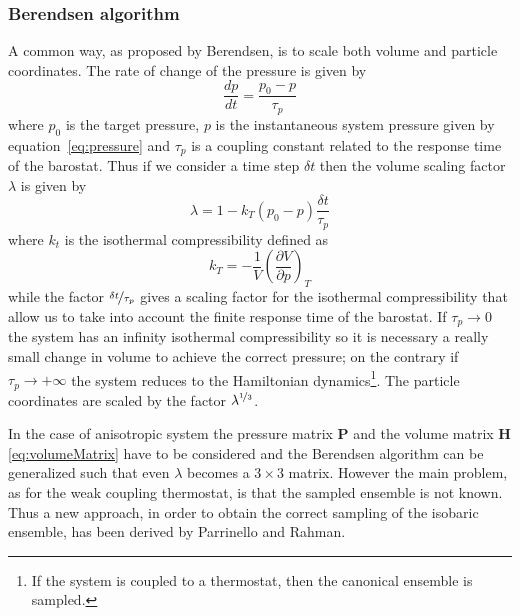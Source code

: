 \subsubsection{Berendsen algorithm}
A common way, as proposed by Berendsen, is to scale both volume and particle coordinates. The rate of change of
the pressure is given by
\begin{equation*}
	\frac{dp}{dt} = \frac{p_0 - p}{\tau_p}
\end{equation*}
where $p_0$ is the target pressure, $p$ is the instantaneous system pressure given by
equation~\eqref{eq:pressure} and $\tau_p$ is a coupling constant related to the response time of the barostat.
Thus if we consider a time step $\delta t$ then the volume scaling factor $\lambda$ is given by
\begin{equation*}
	\lambda = 1- k_T (p_0 - p) \frac{\delta t}{\tau_p}
\end{equation*}
where $k_t$ is the isothermal compressibility defined as
\begin{equation*}
	k_T = -\frac{1}{V}\left ( \frac{\partial V}{\partial p}\right )_{T}
\end{equation*}
while the factor $\nicefrac{\delta t}{\tau_p}$ gives a scaling factor for the isothermal compressibility that
allow us to take into account the finite response time of the barostat. If $\tau_p \rightarrow 0$ the system has
an infinity isothermal compressibility so it is necessary a really small change in volume to achieve the correct
pressure; on the contrary if $\tau_p \rightarrow +\infty$ the system reduces to the Hamiltonian
dynamics\footnote{If the system is coupled to a thermostat, then the canonical ensemble is sampled.}. The
particle coordinates are scaled by the factor $\lambda^{\nicefrac{1}{3}}$.

In the case of anisotropic system the pressure matrix $\mathbold{P}$ and the volume matrix $\mathbold{H}$
\eqref{eq:volumeMatrix} have to be considered and the Berendsen algorithm can be generalized such that even
$\lambda$ becomes a $3\times 3$ matrix. However the main problem, as for the weak coupling thermostat, is that
the sampled ensemble is not known. Thus a new approach, in order to obtain the correct sampling of the isobaric 
ensemble, has been derived by Parrinello and Rahman.

